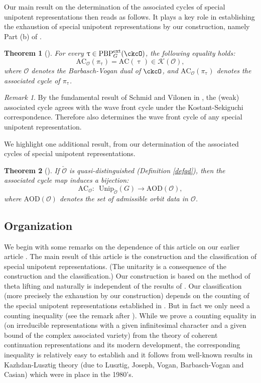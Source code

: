 \documentclass[11pt,a4paper]{amsart}
\newcommand{\AC}{\mathrm{AC}}
\newcommand{\CK}{{\mathcal {K}}}
\newcommand{\CO}{{\mathcal {O}}}
\numberwithin{equation}{section}
\newtheorem{thm}{Theorem}[section]
\theoremstyle{remark}
\newtheorem*{remark}{Remark}
\def\PBPeg{\mathrm{PBP}^{\mathrm{ext}}_{G}}
\def\AC{\mathrm{AC}}
\begin{document}
Our main result on the determination of the associated cycles of special unipotent representations then reads as follows. It plays a key role in establishing the exhaustion of special unipotent representations by our construction, namely Part (b) of . 

\begin{thm}[]\label{thmD} For every $\uptau\in \PBPeg(\ckcO)$, the following equality holds: 
\[
\AC_\CO(\pi_\uptau)=\AC(\uptau)\in \CK(\CO), 
\]
where $\CO$ denotes the Barbasch-Vogan dual of $\ckcO$, and $\AC_\CO(\pi_\uptau)$ denotes the associated cycle of $\pi_\uptau$. 
\end{thm}

\begin{remark} By the fundamental result of Schmid and Vilonen in \cite{SV}, the (weak) associated cycle agrees with the wave
front cycle under the Kostant-Sekiguchi
correspondence. Therefore  also determines the wave front cycle of any special unipotent representation.     
\end{remark}


We highlight one additional result, from our determination of the associated cycles of special unipotent representations.  

\begin{thm}[] \label{thmE} If $\check \CO$ is quasi-distinguished (Definition \ref{defqd}), then the associated cycle map induces a bijection:
\[
\mathrm{AC}_{\CO}: \,\,\, \mathrm{Unip}_{\check \CO}(G)\rightarrow  \mathrm{AOD}(\CO),\]
where $\mathrm{AOD}(\CO)$ denotes the set of admissible orbit data in $\CO$. 
\end{thm}



\subsection{Organization}\label{subsec:outline}

We begin with some remarks on the dependence of this article on our earlier article \cite{BMSZa}. The main result of this article is the construction and the classification of special unipotent representations. (The unitarity is a consequence of the construction and the classification.) Our construction is based on the method of theta lifting and naturally is independent of the results of \cite{BMSZa}. Our classification (more precisely the exhaustion by our construction) depends on the counting of the special unipotent representations established in \cite{BMSZa}. But in fact we only need a counting inequality (see the remark after ). While we prove a counting equality in \cite{BMSZa} (on irreducible representations with a given infinitesimal character and a given bound of the complex associated variety) from the theory of coherent continuation representations and its modern development, the corresponding inequality is relatively easy to establish and it follows from well-known results in Kazhdan-Lusztig theory (due to Lusztig, Joseph, Vogan, Barbasch-Vogan and Casian) which were in place in  the 1980's. 
\end{document}
